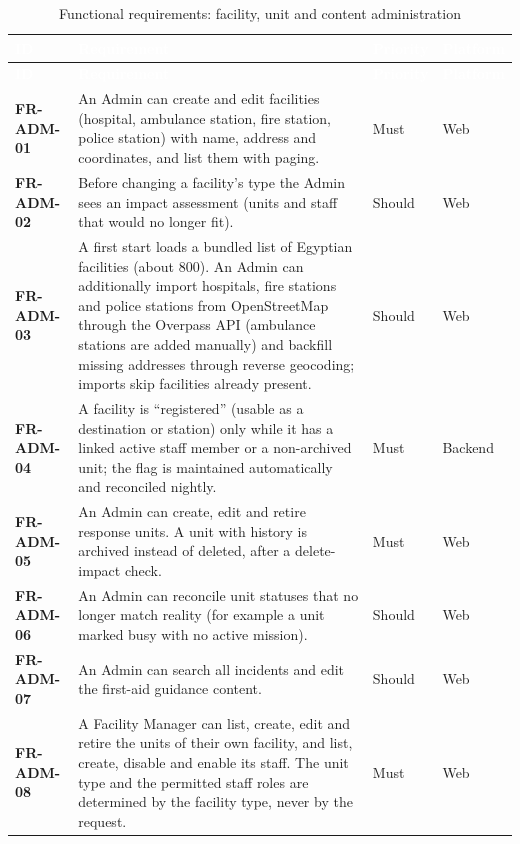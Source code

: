 {\tabfont\rowband
\begin{longtable}{@{}>{\raggedright\arraybackslash}p{}>{\raggedright\arraybackslash}p{}>{\raggedright\arraybackslash}p{}>{\raggedright\arraybackslash}p{}@{}}
\caption{Functional requirements: facility, unit and content administration}\label{tab:fr-adm}\\
\rowcolor{najdanavy}\textcolor{white}{\sffamily\bfseries\small ID} & \textcolor{white}{\sffamily\bfseries\small Requirement} & \textcolor{white}{\sffamily\bfseries\small Priority} & \textcolor{white}{\sffamily\bfseries\small Platform}\\
\endfirsthead
\rowcolor{najdanavy}\textcolor{white}{\sffamily\bfseries\small ID} & \textcolor{white}{\sffamily\bfseries\small Requirement} & \textcolor{white}{\sffamily\bfseries\small Priority} & \textcolor{white}{\sffamily\bfseries\small Platform}\\
\endhead
\bottomrule\endlastfoot
\textbf{FR-ADM-01} & An Admin can create and edit facilities (hospital, ambulance station, fire station, police station) with name, address and coordinates, and list them with paging. & Must & Web\\
\textbf{FR-ADM-02} & Before changing a facility’s type the Admin sees an impact assessment (units and staff that would no longer fit). & Should & Web\\
\textbf{FR-ADM-03} & A first start loads a bundled list of Egyptian facilities (about 800). An Admin can additionally import hospitals, fire stations and police stations from OpenStreetMap through the Overpass API (ambulance stations are added manually) and backfill missing addresses through reverse geocoding; imports skip facilities already present. & Should & Web\\
\textbf{FR-ADM-04} & A facility is “registered” (usable as a destination or station) only while it has a linked active staff member or a non-archived unit; the flag is maintained automatically and reconciled nightly. & Must & Backend\\
\textbf{FR-ADM-05} & An Admin can create, edit and retire response units. A unit with history is archived instead of deleted, after a delete-impact check. & Must & Web\\
\textbf{FR-ADM-06} & An Admin can reconcile unit statuses that no longer match reality (for example a unit marked busy with no active mission). & Should & Web\\
\textbf{FR-ADM-07} & An Admin can search all incidents and edit the first-aid guidance content. & Should & Web\\
\textbf{FR-ADM-08} & A Facility Manager can list, create, edit and retire the units of their own facility, and list, create, disable and enable its staff. The unit type and the permitted staff roles are determined by the facility type, never by the request. & Must & Web\\
\end{longtable}}
